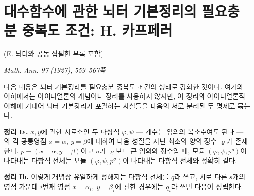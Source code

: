 
\section*{대수함수에 관한 뇌터 기본정리의 필요충분 중복도 조건: H. 카프페러}

\begin{center}
(E. 뇌터와 공동 집필한 부록 포함)

\emph{Math. Ann. 97 (1927), 559--567쪽}
\end{center}

다음 내용은 뇌터 기본정리를 필요충분 중복도 조건의 형태로 강화한 것이다. 여기와 이하에서는 아이디얼론의 개념이나 정리를 사용하지 않지만, 이 정리의 아이디얼론적 이해에 기대어 뇌터 기본정리가 포괄하는 사실들을 다음의 서로 분리된 두 명제로 묶는다.

\textbf{정리 Ia.} \(x,y\)에 관한 서로소인 두 다항식 \(\varphi,\psi\) --- 계수는 임의의 복소수여도 된다 --- 의 각 공통영점 \(x=\alpha,\ y=\beta\)에 대하여 다음 성질을 지닌 최소의 양의 정수 \(\varrho\)가 존재한다. \(p=(x-\alpha,y-\beta)\)이고 \(\sigma\)가 \(\varrho\)보다 큰 임의의 정수일 때, 모듈 \((\varphi,\psi,p^\varrho)\)이 나타내는 다항식 전체는 모듈 \((\varphi,\psi,p^\sigma)\)이 나타내는 다항식 전체와 정확히 같다.

\textbf{정리 Ib.} 이렇게 개념상 유일하게 정해지는 다항식 전체를 \(q\)라 쓰고, 서로 다른 \(s\)개의 영점 가운데 \(i\)번째 영점 \(x=\alpha_i,\ y=\beta_i\)에 관한 경우에는 \(q_i\)라 쓰면 다음이 성립한다.

